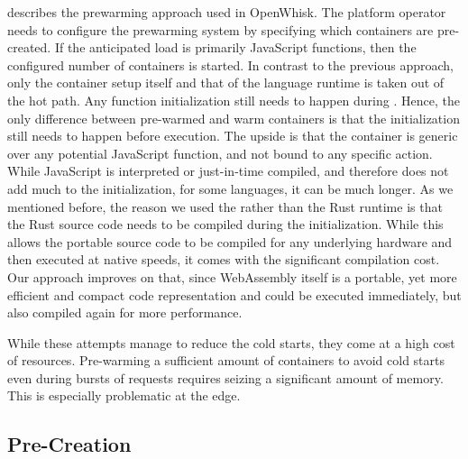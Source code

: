 \citeauthor{Thoemmes2017} describes the prewarming approach used in OpenWhisk. The platform operator needs to configure the prewarming system by specifying which containers are pre-created. If the anticipated load is primarily JavaScript functions, then the configured number of  containers is started. In contrast to the previous approach, only the container setup itself and that of the language runtime is taken out of the hot path. Any function initialization still needs to happen during . Hence, the only difference between pre-warmed and warm containers is that the initialization still needs to happen before execution. The upside is that the container is generic over any potential JavaScript function, and not bound to any specific action.
While JavaScript is interpreted or just-in-time compiled, and therefore does not add much to the initialization, for some languages, it can be much longer. As we mentioned before, the reason we used the  rather than the Rust runtime is that the Rust source code needs to be compiled during the initialization. While this allows the portable source code to be compiled for any underlying hardware and then executed at native speeds, it comes with the significant compilation cost. Our approach improves on that, since WebAssembly itself is a portable, yet more efficient and compact code representation and could be executed immediately, but also compiled again for more performance.

While these attempts manage to reduce the cold starts, they come at a high cost of resources. Pre-warming a sufficient amount of containers to avoid cold starts even during bursts of requests requires seizing a significant amount of memory. This is especially problematic at the edge.

\subsection{Pre-Creation}

